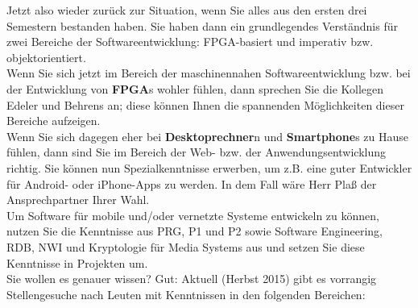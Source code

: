 Jetzt also wieder zurück zur Situation, wenn Sie alles aus den ersten drei Semestern bestanden haben. Sie haben dann ein grundlegendes Verständnis für zwei Bereiche der Softwareentwicklung: FPGA-basiert und imperativ bzw. objektorientiert.\\

Wenn Sie sich jetzt im Bereich der maschinennahen Softwareentwicklung bzw. bei der Entwicklung von \textbf{FPGA}s wohler fühlen, dann sprechen Sie die Kollegen Edeler und Behrens an; diese können Ihnen die spannenden Möglichkeiten dieser Bereiche aufzeigen.\\

Wenn Sie sich dagegen eher bei \textbf{Desktoprechner}n und \textbf{Smartphone}s zu Hause fühlen, dann sind Sie im Bereich der Web- bzw. der Anwendungsentwicklung richtig. Sie können nun Spezialkenntnisse erwerben, um z.B. eine guter Entwickler für Android- oder iPhone-Apps zu werden. In dem Fall wäre Herr Plaß der Ansprechpartner Ihrer Wahl.\\

Um Software für mobile und/oder vernetzte Systeme entwickeln zu können, nutzen Sie die Kenntnisse aus PRG, P1 und P2 sowie Software Engineering, RDB, NWI und Kryptologie für Media Systems aus und setzen Sie diese Kenntnisse in Projekten um.\\

Sie wollen es genauer wissen? Gut: Aktuell (Herbst 2015) gibt es vorrangig Stellengesuche nach Leuten mit Kenntnissen in den folgenden Bereichen: 

